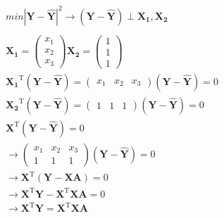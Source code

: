 \documentclass{article}
\begin{document}
\begin{equation}
\begin{aligned}
        min |\mathbf{Y}-\mathbf{\hat{Y}}|^2 \to (\mathbf{Y}-\mathbf{\hat{Y}})\perp\mathbf{X_1},\mathbf{X_2}\\
        \\
        \mathbf{X_1}=\begin{pmatrix}
            x_1\\
            x_2\\
            x_3
        \end{pmatrix}
        \mathbf{X_2}=\begin{pmatrix}
            1\\
            1\\
            1
        \end{pmatrix}\\
        \mathbf{X_1}^\mathrm{T}(\mathbf{Y}-\mathbf{\hat{Y}})=\begin{pmatrix}
            x_1&x_2&x_3
        \end{pmatrix}(\mathbf{Y}-\mathbf{\hat{Y}})=0\\
        \mathbf{X_2}^\mathrm{T}(\mathbf{Y}-\mathbf{\hat{Y}})=\begin{pmatrix}
            1&1&1
        \end{pmatrix}(\mathbf{Y}-\mathbf{\hat{Y}})=0\\
        \mathbf{X}^\mathrm{T}(\mathbf{Y}-\mathbf{\hat{Y}})=0\\
        \to \begin{pmatrix}
            x_1&x_2&x_3\\
            1&1&1
        \end{pmatrix}(\mathbf{Y}-\mathbf{\hat{Y}})=0\\
        \to \mathbf{X}^\mathrm{T}(\mathbf{Y}-\mathbf{XA})=0\\
        \to \mathbf{X}^\mathrm{T}\mathbf{Y}-\mathbf{X}^\mathrm{T}\mathbf{XA}=0\\
        \to \mathbf{X}^\mathrm{T}\mathbf{Y}=\mathbf{X}^\mathrm{T}\mathbf{XA}
    \end{aligned}   
\end{equation}
\end{document}
